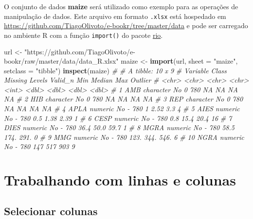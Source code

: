 \documentclass[
]{book}
\newenvironment{Shaded}{\begin{snugshade}}{\end{snugshade}}
\newcommand{\CommentTok}[1]{\textcolor[rgb]{0.56,0.35,0.01}{\textit{#1}}}
\newcommand{\DataTypeTok}[1]{\textcolor[rgb]{0.13,0.29,0.53}{#1}}
\newcommand{\KeywordTok}[1]{\textcolor[rgb]{0.13,0.29,0.53}{\textbf{#1}}}
\newcommand{\NormalTok}[1]{#1}
\newcommand{\StringTok}[1]{\textcolor[rgb]{0.31,0.60,0.02}{#1}}
\begin{document}
O conjunto de dados \textbf{maize} será utilizado como exemplo para as operações de manipulação de dados. Este arquivo em formato \texttt{.xlsx} está hospedado em \url{https://github.com/TiagoOlivoto/e-bookr/tree/master/data} e pode ser carregado no ambiente R com a função \texttt{import()} do pacote \href{https://cran.r-project.org/web/packages/rio/index.html}{rio}.

\begin{Shaded}
\begin{Highlighting}[]
\NormalTok{url <-}\StringTok{ "https://github.com/TiagoOlivoto/e-bookr/raw/master/data/data_R.xlsx"}
\NormalTok{maize <-}\StringTok{ }\KeywordTok{import}\NormalTok{(url,}
                \DataTypeTok{sheet =} \StringTok{"maize"}\NormalTok{, }
                \DataTypeTok{setclass =} \StringTok{"tibble"}\NormalTok{)}
\KeywordTok{inspect}\NormalTok{(maize)}
\CommentTok{# # A tibble: 10 x 9}
\CommentTok{#    Variable Class     Missing Levels Valid_n   Min Median    Max Outlier}
\CommentTok{#    <chr>    <chr>     <chr>   <chr>    <int> <dbl>  <dbl>  <dbl>   <dbl>}
\CommentTok{#  1 AMB      character No      0          780  NA    NA     NA         NA}
\CommentTok{#  2 HIB      character No      0          780  NA    NA     NA         NA}
\CommentTok{#  3 REP      character No      0          780  NA    NA     NA         NA}
\CommentTok{#  4 APLA     numeric   No      -          780   1     2.52   3.3        4}
\CommentTok{#  5 AIES     numeric   No      -          780   0.5   1.38   2.39       1}
\CommentTok{#  6 CESP     numeric   No      -          780   0.8  15.4   20.4       16}
\CommentTok{#  7 DIES     numeric   No      -          780  36.4  50.0   59.7        1}
\CommentTok{#  8 MGRA     numeric   No      -          780  58.5 174.   291.         0}
\CommentTok{#  9 MMG      numeric   No      -          780 123.  344.   546.         6}
\CommentTok{# 10 NGRA     numeric   No      -          780 147   517    903          9}
\end{Highlighting}
\end{Shaded}

\hypertarget{trabalhando-com-linhas-e-colunas}{%
\section{Trabalhando com linhas e colunas}\label{trabalhando-com-linhas-e-colunas}}

\hypertarget{selecionar-colunas}{%
\subsection{Selecionar colunas}\label{selecionar-colunas}}
\end{document}
